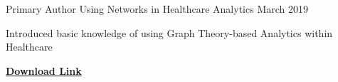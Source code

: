 

\begin{cventries}

  \cventry
    {Primary Author} %
    {Using Networks in Healthcare Analytics} %
    {}%
    {March 2019} %
    {
      \begin{cvitems} %
        \item {Introduced basic knowledge of using Graph Theory-based Analytics within Healthcare}
        \item {\href{https://www.prmanalytics.com/assets/white\_papers/Using\%20Networks\%20in\%20Healthcare\%20Analytics.pdf}{\textbf{Download Link}}}
      \end{cvitems}
    }

\end{cventries}
